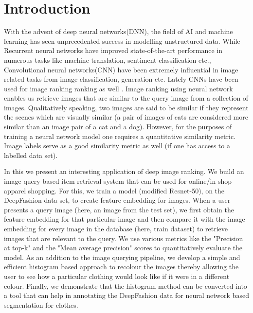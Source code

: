 \section{Introduction}
With the advent of deep neural networks(DNN), the field of AI and machine learning has seen unprecedented success in modelling unstructured data. While Recurrent neural networks have improved state-of-the-art performance in numerous tasks like machine translation, sentiment classification etc., Convolutional neural networks(CNN) have been extremely influential in image related tasks from image classification, generation etc. Lately CNNs have been used for image ranking ranking as well \cite{wang2014learning}. Image ranking using neural network enables us retrieve images that are similar to the query image from a collection of images. Qualitatively speaking, two images are said to be similar if they represent the scenes which are visually similar (a pair of images of cats are considered more similar than an image pair of a cat and a dog). However, for the purposes of training a neural network model one requires a quantitative similarity metric. Image labels serve as a good similarity metric as well (if one has access to a labelled data set).


In this we present an interesting application of deep image ranking. We build an image query based item retrieval system that can be used for online/in-shop apparel shopping. For this, we train a model (modified Resnet-50), on the DeepFashion\cite{liu2016deepfashion} data set, to create feature embedding for images. When a user presents a query image (here, an image from the test set), we first obtain the feature embedding for that particular image and then compare it with the image embedding for every image in the database (here, train dataset) to retrieve images that are relevant to the query. We use various metrics like the "Precision at top-k" and the "Mean average precision" scores to quantitatively evaluate the model. As an addition to the image querying pipeline, we develop a simple and efficient histogram based approach to recolour the images thereby allowing the user to see how a particular clothing would look like if it were in a different colour. Finally, we demonstrate that the histogram method can be converted into a tool that can help in annotating the DeepFashion data for neural network based segmentation for clothes.

